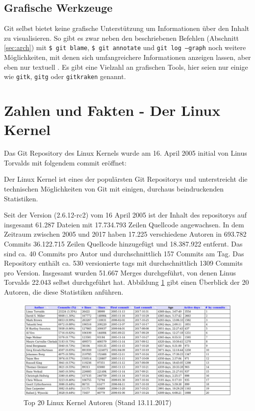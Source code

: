 \subsection{Grafische Werkzeuge}
Git selbst bietet keine grafische Unterstützung um Informationen über den
Inhalt zu visualisieren. So gibt es zwar neben den beschriebenen Befehlen
(Abschnitt \ref{sec:arch}) mit \texttt{\$ git blame}, \texttt{\$ git annotate}
und \texttt{git log --graph} noch weitere Möglichkeiten, mit denen sich
umfangreichere Informationen anzeigen lassen, aber eben nur textuell
\cite[S.~302]{gitwf}. Es gibt eine Vielzahl an grafischen Tools, hier seien nur
einige wie \texttt{gitk}, \texttt{gitg} oder \texttt{gitkraken} genannt.

\section{Zahlen und Fakten - Der Linux Kernel}\label{sec:kernel}
Das Git Repository des Linux Kernels wurde am 16. April 2005 initial von Linus
Torvalds mit folgendem \gls{commit} \cite{link:linuxgit} eröffnet:


Der Linux Kernel ist eines der populärsten Git Repositorys und unterstreicht
die technischen Möglichkeiten von Git mit einigen, durchaus beindruckenden
Statistiken.

Seit der Version (2.6.12-rc2) vom 16 April 2005 ist der Inhalt des
\glspl{repository} auf insgesamt 61.287 Dateien mit 17.734.793 Zeilen Quellcode
angewachsen. In dem Zeitraum zwischen 2005 und 2017 haben 17.225 verschiedene
Autoren in 693.782 Commits 36.122.715 Zeilen Quellcode hinzugefügt und
18.387.922 entfernt. Das sind ca. 40 Commits pro Autor und durchschnittlich
157 Commits am Tag. Das Repository enthält ca. 530 versionierte \glspl{tag}
mit durchschnittlich 1309 Commits pro Version. Insgesamt wurden
51.667 Merges durchgeführt, von denen Linus Torvalds 22.043 selbst durchgeführt
hat. Abbildung \ref{top20} gibt einen Überblick der 20 Autoren, die diese
Statistiken anführen.

\begin{figure}
	\centering
  \includegraphics[scale=0.40]{images/top_20_of_linux_authors.png}
	\caption{Top 20 Linux Kernel Autoren (Stand 13.11.2017)}
	\label{top20}
\end{figure}

